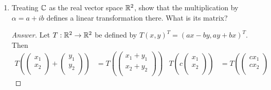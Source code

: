 \documentclass[../psets.tex]{subfiles}
\begin{document}
\begin{enumerate}[label={\textbf{3.\arabic*.}}]
\begin{enumerate}
\begin{proof}[Answer]
            Let $T:\C\to\C$ be defined by $Tx=\alpha x$. Then
            \begin{align*}
                T(x+y) &= \alpha(x+y)&
                    T(\beta x) &= \alpha(\beta x)\\
                &= \alpha x+\alpha y&
                    &= \beta(\alpha x)\\
                &= Tx+Ty&
                    &= \beta Tx
            \end{align*}
            so $T$ is linear. The matrix of $T$ is $[\alpha]$.
        \end{proof}
        \item Treating $\mathbb{C}$ as the real vector space $\mathbb{R}^2$, show that the multiplication by $\alpha=a+ib$ defines a linear transformation there. What is its matrix?
        \begin{proof}[Answer]
            Let $T:\mathbb{R}^2\to\mathbb{R}^2$ be defined by $T(x,y)^T=(ax-by,ay+bx)^T$. Then
            \begin{align*}
                T\left( 
                    \begin{pmatrix}
                        x_1\\
                        x_2\\
                    \end{pmatrix}
                    +
                    \begin{pmatrix}
                        y_1\\
                        y_2\\
                    \end{pmatrix}
                \right) &= T\left( 
                    \begin{pmatrix}
                        x_1+y_1\\
                        x_2+y_2\\
                    \end{pmatrix}
                \right)&
                    T\left( c
                        \begin{pmatrix}
                            x_1\\
                            x_2\\
                        \end{pmatrix}
                    \right) &= T\left( 
                        \begin{pmatrix}
                            cx_1\\
                            cx_2\\

\end{pmatrix}
\end{align*}
\end{proof}
\end{enumerate}
\end{enumerate}
\end{document}

